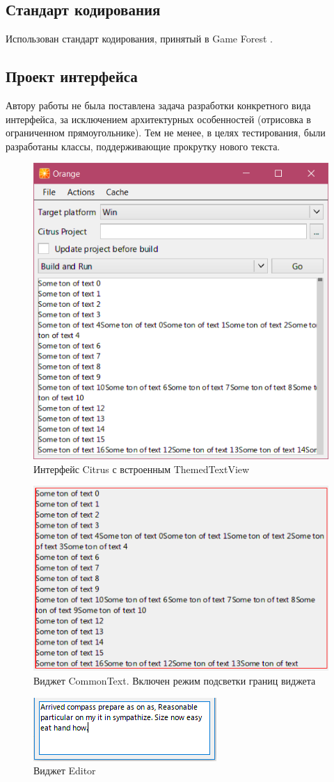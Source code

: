 \documentclass{fefu}
\begin{document}
		\subsection{Стандарт кодирования}
			Использован стандарт кодирования, принятый в Game Forest \cite{CodingConventions}.
		\subsection{Проект интерфейса}
			\par Автору работы не была поставлена задача разработки конкретного вида интерфейса, за
			исключением архитектурных особенностей (отрисовка в ограниченном прямоугольнике).
			Тем не менее, в целях тестирования, были разработаны классы, поддерживающие 
			прокрутку нового текста.
			\begin{figure}[H]
				\centering
				\includegraphics[width=0.5\linewidth]{images/ScrollViewInt.png}
				\caption{Интерфейс Citrus с встроенным ThemedTextView}
			\end{figure}
			\begin{figure}[H]
				\centering
				\includegraphics[width=0.5\linewidth]{images/CommonTextInt.png}
				\caption{Виджет CommonText. Включен режим подсветки 
				границ виджета}
			\end{figure}
			\begin{figure}[H]
				\centering
				\includegraphics[width=0.5\linewidth]{images/EditBox.png}
				\caption{Виджет Editor}
			\end{figure}
\end{document}
